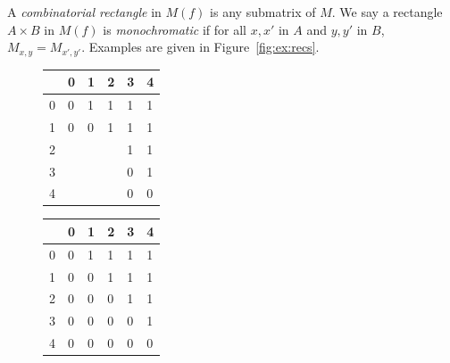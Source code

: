 \documentclass[12pt]{article}
\begin{document}
\begin{definition}
A \emph{combinatorial rectangle} in $M(f)$ is any submatrix of $M$.
We say a rectangle $A \times B$ in $M(f)$ is \emph{monochromatic}
if for all $x, x'$ in $A$ and $y, y'$ in $B$, $M_{x,y} = M_{x',y'}$.
Examples are given in Figure~\ref{fig:ex:recs}.
\end{definition}

\begin{figure}[h]
\centering 
	\begin{minipage}{0.25\textwidth}
		\begin{tabular}{|l|lllll|}
		\hline
		    & 0 & 1 & 2 & 3 & 4 \\\hline
		0   & 0 & 1 & 1 & 1 & 1 \\
		1   & 0 & 0 & 1 & 1 & 1 \\
		2   & \cellcolor{purple!75}{\textcolor{white}{0}} & \cellcolor{purple!75}{\textcolor{white}{0}} & \cellcolor{purple!75}{\textcolor{white}{0}} & 1 & 1 \\
		3   & \cellcolor{purple!75}{\textcolor{white}{0}} & \cellcolor{purple!75}{\textcolor{white}{0}} & \cellcolor{purple!75}{\textcolor{white}{0}} & 0 & 1 \\
		4   & \cellcolor{purple!75}{\textcolor{white}{0}} & \cellcolor{purple!75}{\textcolor{white}{0}} & \cellcolor{purple!75}{\textcolor{white}{0}} & 0 & 0\\\hline
		\end{tabular}
	\end{minipage}
	\begin{minipage}{0.25\textwidth}
		\begin{tabular}{|l|lllll|}
		\hline
		    & 0 & 1 & 2 & 3 & 4 \\\hline
		0   & \cellcolor{orange!75}0 & 1 & \cellcolor{orange!75}1 & 1 & \cellcolor{orange!75}1 \\
		1   & \cellcolor{orange!75}0 & 0 & \cellcolor{orange!75}1 & 1 & \cellcolor{orange!75}1 \\
		2   & 0 & 0 & 0 & 1 & 1 \\
		3   & \cellcolor{orange!75}0 & 0 & \cellcolor{orange!75}0 & 0 & \cellcolor{orange!75}1 \\
		4   & 0 & 0 & 0 & 0 & 0\\\hline
		\end{tabular} 
	\end{minipage}
	\begin{minipage}{0.25\textwidth}
		\begin{tabular}{|l|lllll|}

\end{tabular}
\end{minipage}
\end{figure}
\end{document}
